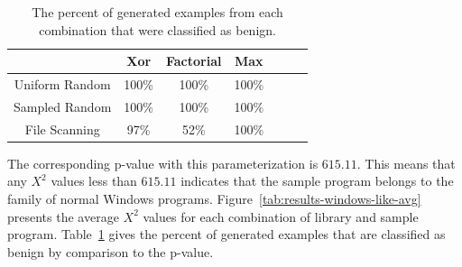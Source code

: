     \begin{table}
        \centering
        \begin{tabular}{|c||c|c|c|c|c|c|}
            \hline
                            & Xor & Factorial & Max \\
            \hline
            Uniform Random  & 100\% & 100\% & 100\%\\
            \hline
            Sampled Random  & 100\% & 100\% & 100\%\\
            \hline
            File Scanning   & 97\% & 52\% & 100\% \\
            \hline
        \end{tabular}
        \caption{The percent of generated examples from each combination
            that were classified as benign.}
        \label{tab:results-windows-like-passed}
    \end{table}

    The corresponding p-value with this parameterization is $615.11$. This
    means that any $X^2$ values less than $615.11$ indicates that the sample
    program belongs to the family of normal Windows programs.
    Figure~\ref{tab:results-windows-like-avg} presents the average $X^2$
    values for each combination of library and sample program.
    Table~\ref{tab:results-windows-like-passed} gives the percent of
    generated examples that are classified as benign by comparison to the
    p-value.


